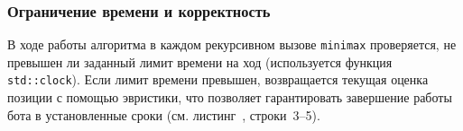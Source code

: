 \subsubsection*{Ограничение времени и корректность}

В ходе работы алгоритма в каждом рекурсивном вызове \lstinline|minimax| проверяется, не превышен ли заданный лимит времени на ход (используется функция \lstinline|std::clock|). Если лимит времени превышен, возвращается текущая оценка позиции с помощью эвристики, что позволяет гарантировать завершение работы бота в установленные сроки (см. листинг~, строки~3--5).
